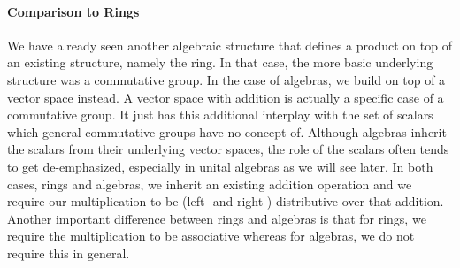 \paragraph{Comparison to Rings}
We have already seen another algebraic structure that defines a product on top of an existing structure, namely the ring. In that case, the more basic underlying structure was a commutative group. In the case of algebras, we build on top of a vector space instead. A vector space with addition is actually a specific case of a commutative group. It just has this additional interplay with the set of scalars which general commutative groups have no concept of. Although algebras inherit the scalars from their underlying vector spaces, the role of the scalars often tends to get de-emphasized, especially in unital algebras as we will see later. In both cases, rings and algebras, we inherit an existing addition operation and we require our multiplication to be (left- and right-) distributive over that addition. Another important difference between rings and algebras is that for rings, we require the multiplication to be associative whereas for algebras, we do not require this in general.








